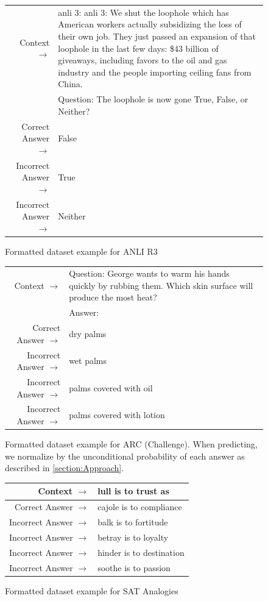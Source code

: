 \begin{figure} { \tt \footnotesize \begin{tabularx}{\linewidth}{r X} \toprule Context $\to$ & anli 3: anli 3: We shut the loophole which has American workers actually subsidizing the loss of their own job. They just passed an expansion of that loophole in the last few days: \$43 billion of giveaways, including favors to the oil and gas industry and the people importing ceiling fans from China. \\ 
 & Question: The loophole is now gone True, False, or Neither? \\ 
 \midrule Correct Answer $\to$ & False \\ 
 Incorrect Answer $\to$ & True \\ 
 Incorrect Answer $\to$ & Neither\\ \bottomrule \end{tabularx} }  \caption{Formatted dataset example for ANLI R3}  \label{eval:ANLI R3}  \end{figure}%
\begin{figure} { \tt \footnotesize \begin{tabularx}{\linewidth}{r X} \toprule Context $\to$ & Question: George wants to warm his hands quickly by rubbing them. Which skin surface will produce the most heat? \\ 
 & Answer: \\ 
 \midrule Correct Answer $\to$ & dry palms \\ 
 Incorrect Answer $\to$ & wet palms \\ 
 Incorrect Answer $\to$ & palms covered with oil \\ 
 Incorrect Answer $\to$ & palms covered with lotion\\ \bottomrule \end{tabularx} }  \caption{Formatted dataset example for ARC (Challenge). When predicting, we normalize by the unconditional probability of each answer as described in \ref{section:Approach}.}  \label{eval:ARC (Challenge)}  \end{figure}%
\begin{figure} { \tt \footnotesize \begin{tabularx}{\linewidth}{r X} \toprule Context $\to$ & lull is to trust as \\ 
 \midrule Correct Answer $\to$ & cajole is to compliance \\ 
 Incorrect Answer $\to$ & balk is to fortitude \\ 
 Incorrect Answer $\to$ & betray is to loyalty \\ 
 Incorrect Answer $\to$ & hinder is to destination \\ 
 Incorrect Answer $\to$ & soothe is to passion\\ \bottomrule \end{tabularx} }  \caption{Formatted dataset example for SAT Analogies}  \label{eval:SAT Analogies}  \end{figure}%
